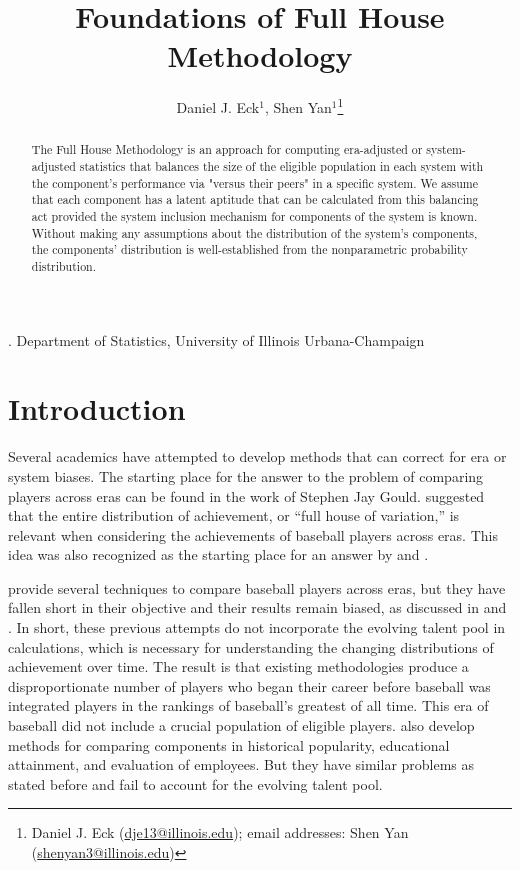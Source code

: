 \documentclass[12pt]{article}
\title{Foundations of Full House Methodology}
\author{Daniel J. Eck$^1$, Shen Yan$^1$\thanks{Daniel J. Eck (\url{dje13@illinois.edu}); email addresses: Shen Yan (\url{shenyan3@illinois.edu})}}
\date{}
\begin{document}
\maketitle

{. Department of Statistics, University of Illinois Urbana-Champaign \\}


\begin{abstract}
The Full House Methodology is an approach for computing era-adjusted or system-adjusted statistics that balances the size of the eligible population in each system with the component's performance via "versus their peers" in a specific system. We assume that each component has a latent aptitude that can be calculated from this balancing act provided the system inclusion mechanism for components of the system is known. Without making any assumptions about the distribution of the system's components, the components' distribution is well-established from the nonparametric probability distribution.

\end{abstract}

\section{Introduction}

Several academics have attempted to develop methods that can correct for era or system biases. The starting place for the answer to the problem of comparing players across eras can be found in the work of Stephen Jay Gould. \cite{Gould96} suggested that the entire distribution of achievement, or ``full house of variation,'' is relevant when considering the achievements of baseball players across eras. This idea was also recognized as the starting place for an answer by \cite{SM13} and \cite{SM16}. 

\cite{BRL99, PPE11, SM13, SM16, PP20} provide several techniques to compare baseball players across eras, but they have fallen short in their objective and their results remain biased, as discussed in \cite{DE20} and \cite{DE20b}. In short, these previous attempts do not incorporate the evolving talent pool in calculations, which is necessary for understanding the changing distributions of achievement over time. The result is that existing methodologies produce a disproportionate number of players who began their career before baseball was integrated players in the rankings of baseball's greatest of all time. This era of baseball did not include a crucial population of eligible players. \cite{YZ16, meyer2021talents, campbell1990modeling} also develop methods for comparing components in historical popularity, educational attainment, and evaluation of employees. But they have similar problems as stated before and fail to account for the evolving talent pool.
\end{document}
